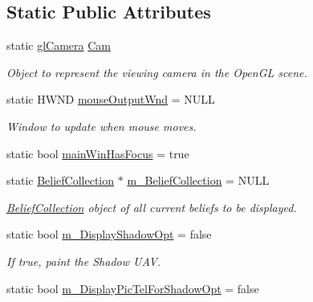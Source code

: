 \subsection*{Static Public Attributes}
\begin{DoxyCompactItemize}
\item 
\hypertarget{class_viewer3_d_a52f7a9d9ffcdb30733150ab2295b8c00}{
static \hyperlink{classgl_camera}{glCamera} \hyperlink{class_viewer3_d_a52f7a9d9ffcdb30733150ab2295b8c00}{Cam}}
\label{class_viewer3_d_a52f7a9d9ffcdb30733150ab2295b8c00}

\begin{DoxyCompactList}\small\item\em Object to represent the viewing camera in the OpenGL scene. \end{DoxyCompactList}\item 
\hypertarget{class_viewer3_d_a7a1db7770b207a773e4bd7222f825916}{
static HWND \hyperlink{class_viewer3_d_a7a1db7770b207a773e4bd7222f825916}{mouseOutputWnd} = NULL}
\label{class_viewer3_d_a7a1db7770b207a773e4bd7222f825916}

\begin{DoxyCompactList}\small\item\em Window to update when mouse moves. \end{DoxyCompactList}\item 
static bool \hyperlink{class_viewer3_d_a3d163ddcb1bb9842015c8678f11152fa}{mainWinHasFocus} = true
\item 
\hypertarget{class_viewer3_d_a76fd492107452d7f59f0924a82aa2e6b}{
static \hyperlink{class_belief_collection}{BeliefCollection} $\ast$ \hyperlink{class_viewer3_d_a76fd492107452d7f59f0924a82aa2e6b}{m\_\-BeliefCollection} = NULL}
\label{class_viewer3_d_a76fd492107452d7f59f0924a82aa2e6b}

\begin{DoxyCompactList}\small\item\em \hyperlink{class_belief_collection}{BeliefCollection} object of all current beliefs to be displayed. \end{DoxyCompactList}\item 
\hypertarget{class_viewer3_d_a5213015306f85602d4708f74a0aa55cb}{
static bool \hyperlink{class_viewer3_d_a5213015306f85602d4708f74a0aa55cb}{m\_\-DisplayShadowOpt} = false}
\label{class_viewer3_d_a5213015306f85602d4708f74a0aa55cb}

\begin{DoxyCompactList}\small\item\em If true, paint the Shadow UAV. \end{DoxyCompactList}\item 
\hypertarget{class_viewer3_d_a28c2f3011225a1690784273615dfc656}{
static bool \hyperlink{class_viewer3_d_a28c2f3011225a1690784273615dfc656}{m\_\-DisplayPicTelForShadowOpt} = false}
\label{class_viewer3_d_a28c2f3011225a1690784273615dfc656}


\end{DoxyCompactItemize}
